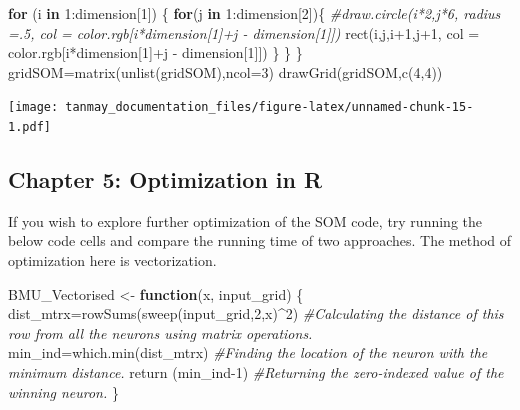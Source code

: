 \documentclass[
]{article}
\newenvironment{Shaded}{\begin{snugshade}}{\end{snugshade}}
\newcommand{\AttributeTok}[1]{\textcolor[rgb]{0.77,0.63,0.00}{#1}}
\newcommand{\CommentTok}[1]{\textcolor[rgb]{0.56,0.35,0.01}{\textit{#1}}}
\newcommand{\ControlFlowTok}[1]{\textcolor[rgb]{0.13,0.29,0.53}{\textbf{#1}}}
\newcommand{\DecValTok}[1]{\textcolor[rgb]{0.00,0.00,0.81}{#1}}
\newcommand{\FunctionTok}[1]{\textcolor[rgb]{0.00,0.00,0.00}{#1}}
\newcommand{\NormalTok}[1]{#1}
\newcommand{\OtherTok}[1]{\textcolor[rgb]{0.56,0.35,0.01}{#1}}
\newcommand{\SpecialCharTok}[1]{\textcolor[rgb]{0.00,0.00,0.00}{#1}}
\begin{document}
\begin{Shaded}
\begin{Highlighting}[]
  \ControlFlowTok{for}\NormalTok{ (i }\ControlFlowTok{in} \DecValTok{1}\SpecialCharTok{:}\NormalTok{dimension[}\DecValTok{1}\NormalTok{]) \{}
    \ControlFlowTok{for}\NormalTok{(j }\ControlFlowTok{in} \DecValTok{1}\SpecialCharTok{:}\NormalTok{dimension[}\DecValTok{2}\NormalTok{])\{}
      \CommentTok{\#draw.circle(i*2,j*6, radius =.5, col = color.rgb[i*dimension[1]+j {-} dimension[1]])}
      \FunctionTok{rect}\NormalTok{(i,j,i}\SpecialCharTok{+}\DecValTok{1}\NormalTok{,j}\SpecialCharTok{+}\DecValTok{1}\NormalTok{, }\AttributeTok{col =}\NormalTok{ color.rgb[i}\SpecialCharTok{*}\NormalTok{dimension[}\DecValTok{1}\NormalTok{]}\SpecialCharTok{+}\NormalTok{j }\SpecialCharTok{{-}}\NormalTok{ dimension[}\DecValTok{1}\NormalTok{]])}
\NormalTok{    \}}
\NormalTok{  \}}
\NormalTok{\} }
\NormalTok{gridSOM}\OtherTok{=}\FunctionTok{matrix}\NormalTok{(}\FunctionTok{unlist}\NormalTok{(gridSOM),}\AttributeTok{ncol=}\DecValTok{3}\NormalTok{)}
\FunctionTok{drawGrid}\NormalTok{(gridSOM,}\FunctionTok{c}\NormalTok{(}\DecValTok{4}\NormalTok{,}\DecValTok{4}\NormalTok{))}
\end{Highlighting}
\end{Shaded}

\texttt{[image: tanmay\_documentation\_files/figure-latex/unnamed-chunk-15-1.pdf]}

\hypertarget{chapter-5-optimization-in-r}{%
\subsection{Chapter 5: Optimization in
R}\label{chapter-5-optimization-in-r}}

If you wish to explore further optimization of the SOM code, try running
the below code cells and compare the running time of two approaches. The
method of optimization here is vectorization.

\begin{Shaded}
\begin{Highlighting}[]
\NormalTok{BMU\_Vectorised }\OtherTok{\textless{}{-}} \ControlFlowTok{function}\NormalTok{(x, input\_grid) \{ }
\NormalTok{  dist\_mtrx}\OtherTok{=}\FunctionTok{rowSums}\NormalTok{(}\FunctionTok{sweep}\NormalTok{(input\_grid,}\DecValTok{2}\NormalTok{,x)}\SpecialCharTok{\^{}}\DecValTok{2}\NormalTok{) }\CommentTok{\#Calculating the distance of this row from all the neurons using matrix operations.}
\NormalTok{  min\_ind}\OtherTok{=}\FunctionTok{which.min}\NormalTok{(dist\_mtrx) }\CommentTok{\#Finding the location of the neuron with the minimum distance.}
  \FunctionTok{return}\NormalTok{ (min\_ind}\DecValTok{{-}1}\NormalTok{) }\CommentTok{\#Returning the zero{-}indexed value of the winning neuron.}
\NormalTok{\}}
\end{Highlighting}
\end{Shaded}
\end{document}
